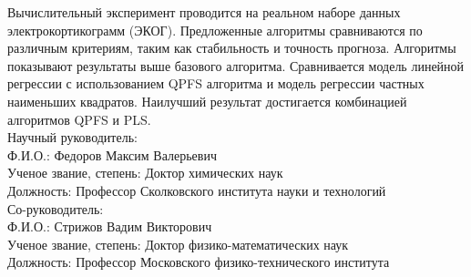 \documentclass[12pt,oneside]{article}
\theoremstyle{definition}
\begin{document}
Вычислительный эксперимент проводится на реальном наборе данных электрокортикограмм (ЭКОГ). 
Предложенные алгоритмы сравниваются по различным критериям, таким как стабильность и точность прогноза.
Алгоритмы показывают результаты выше базового алгоритма.
Сравнивается модель линейной регрессии с использованием QPFS алгоритма и модель регрессии частных наименьших квадратов.
Наилучший результат достигается комбинацией алгоритмов QPFS и PLS.
\\[5mm]
Научный руководитель: \\
Ф.И.О.: Федоров Максим Валерьевич \\
Ученое звание, степень: Доктор химических наук \\
Должность: Профессор Сколковского института науки и технологий \\[5mm]
Со-руководитель: \\
Ф.И.О.: Стрижов Вадим Викторович \\
Ученое звание, степень: Доктор физико-математических наук \\
Должность: Профессор Московского физико-технического института
\end{document}
